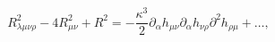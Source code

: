 \begin{equation}
R^2_{\lambda\mu\nu\rho}-4R^2_{\mu\nu}+R^2 = -\frac{\kappa^3}2\partial_\alpha h_{\mu\nu}\partial_\alpha h_{\nu\rho}\partial^2 h_{\rho\mu}+\ldots,
\end{equation}


